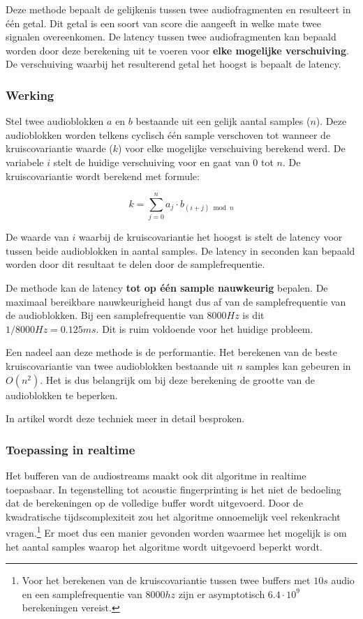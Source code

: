 Deze methode bepaalt de gelijkenis tussen twee audiofragmenten en resulteert in één getal. Dit getal is een soort van score die aangeeft in welke mate twee signalen overeenkomen. De latency tussen twee audiofragmenten kan bepaald worden door deze berekening uit te voeren voor \textbf{elke mogelijke verschuiving}. De verschuiving waarbij het resulterend getal het hoogst is bepaalt de latency.

\subsubsection{Werking}

Stel twee audioblokken $ a $ en $ b $ bestaande uit een gelijk aantal samples ($n$). Deze audioblokken worden telkens cyclisch één sample verschoven tot wanneer de kruiscovariantie waarde ($ k $) voor elke mogelijke verschuiving berekend werd. De variabele $ i $ stelt de huidige verschuiving voor en gaat van 0 tot $ n $. De kruiscovariantie wordt berekend met formule:

\begin{equation}
	k = \sum_{j=0}^{n} a_{j} \cdot b_{(i+j) \bmod n}
\end{equation}

De waarde van $ i $ waarbij de kruiscovariantie het hoogst is stelt de latency voor tussen beide audioblokken in aantal samples. De latency in seconden kan bepaald worden door dit resultaat te delen door de samplefrequentie.

De methode kan de latency \textbf{tot op één sample nauwkeurig} bepalen. De maximaal bereikbare nauwkeurigheid hangt dus af van de samplefrequentie van de audioblokken. Bij een samplefrequentie van $8000 Hz$ is dit $ 1/8000 Hz = 0.125 ms $. Dit is ruim voldoende voor het huidige probleem.

Een nadeel aan deze methode is de performantie. Het berekenen van de beste kruiscovariantie van twee audioblokken bestaande uit $ n $ samples kan gebeuren in  $O(n^{2})$. Het is dus belangrijk om bij deze berekening de grootte van de audioblokken te beperken.

In artikel \cite{six2015multimodal} wordt deze techniek meer in detail besproken.

\subsubsection{Toepassing in realtime}

Het bufferen van de audiostreams maakt ook dit algoritme in realtime toepasbaar. In tegenstelling tot acoustic fingerprinting is het niet de bedoeling dat de berekeningen op de volledige buffer wordt uitgevoerd. Door de kwadratische tijdscomplexiteit zou het algoritme onnoemelijk veel rekenkracht vragen.\footnote{Voor het berekenen van de kruiscovariantie tussen twee buffers met $10s$ audio en een samplefrequentie van $8000hz$ zijn er asymptotisch $ 6.4 \cdot 10^9 $ berekeningen vereist.} Er moet dus een manier gevonden worden waarmee het mogelijk is om het aantal samples waarop het algoritme wordt uitgevoerd beperkt wordt.

